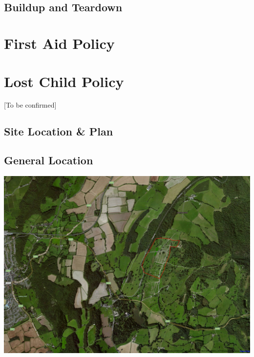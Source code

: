 \begin{landscape}
    \subsection{Buildup and Teardown}
    

\end{landscape}
\restoregeometry

\appendix

\section{First Aid Policy}
\label{first-aid-policy}

\newpage

\section{Lost Child Policy}
\label{lost-child-policy}
[To be confirmed]
\newpage

\begin{landscape}
    \thispagestyle{empty}
    \section{Site Location \& Plan}
    \label{site-plan}
    \subsection{General Location}
    \includegraphics[width=23cm]{./supplementary/wide-map.png}
\end{landscape}

